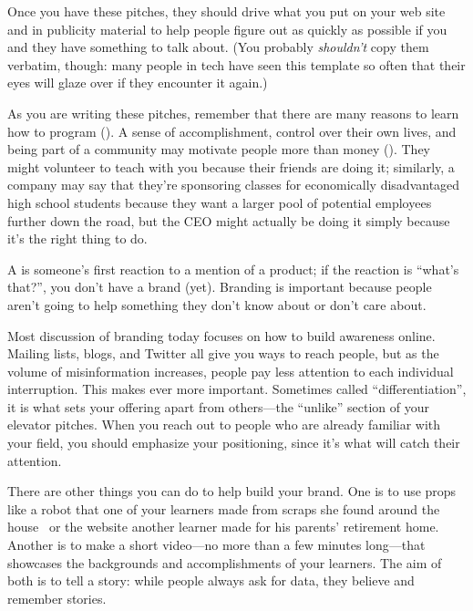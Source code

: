 Once you have these pitches,
they should drive what you put on your web site and in publicity material
to help people figure out as quickly as possible
if you and they have something to talk about.
(You probably \emph{shouldn't} copy them verbatim,
though:
many people in tech have seen this template so often that
their eyes will glaze over if they encounter it again.)

As you are writing these pitches,
remember that there are many reasons to learn how to program
().
A sense of accomplishment,
control over their own lives,
and being part of a community may motivate people more than money
().
They might volunteer to teach with you because their friends are doing it;
similarly,
a company may say that they're sponsoring classes for economically disadvantaged high school students
because they want a larger pool of potential employees further down the road,
but the CEO might actually be doing it simply because it's the right thing to do.


A  is someone's first reaction to a mention of a product;
if the reaction is ``what's that?'',
you don't have a brand (yet).
Branding is important because
people aren't going to help something they don't know about or don't care about.

Most discussion of branding today focuses on
how to build awareness online.
Mailing lists,
blogs,
and Twitter all give you ways to reach people,
but as the volume of misinformation increases,
people pay less attention to each individual interruption.
This makes  ever more important.
Sometimes called ``differentiation'',
it is what sets your offering apart from others---the ``unlike'' section of your elevator pitches.
When you reach out to people who are already familiar with your field,
you should emphasize your positioning,
since it's what will catch their attention.

There are other things you can do to help build your brand.
One is to use props
like a robot that one of your learners made from scraps she found around the house~\cite{Schw2013}
or the website another learner made for his parents' retirement home.
Another is to make a short video---no more than a few minutes long---that showcases
the backgrounds and accomplishments of your learners.
The aim of both is to tell a story:
while people always ask for data,
they believe and remember stories.

